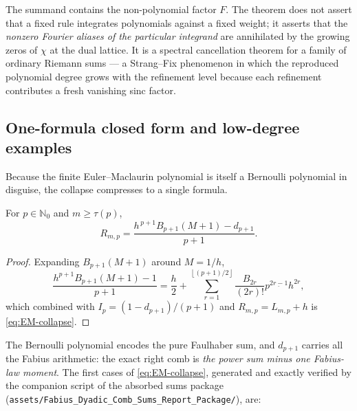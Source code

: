 \documentclass[11pt,oneside]{article}
\numberwithin{equation}{section}
\theoremstyle{definition}
\theoremstyle{remark}
\newcommand{\N}{\mathbb N}
\newcommand{\fall}[2]{#1^{\underline{#2}}}
\newcommand{\floor}[1]{\left\lfloor #1\right\rfloor}
\begin{document}
\begin{remark}
The summand contains the non-polynomial factor $F$.  The theorem does
not assert that a fixed rule integrates polynomials against a fixed
weight; it asserts that the \emph{nonzero Fourier aliases of the
particular integrand} are annihilated by the growing zeros of $\chi$
at the dual lattice.  It is a spectral cancellation theorem for a
family of ordinary Riemann sums --- a Strang--Fix phenomenon
\cite{StrangFix,deBoorRon} in which the reproduced polynomial degree
grows with the refinement level because each refinement contributes a
fresh vanishing sinc factor.
\end{remark}

\subsection{One-formula closed form and low-degree examples}

Because the finite Euler--Maclaurin polynomial is itself a Bernoulli
polynomial in disguise, the collapse compresses to a single formula.

\begin{corollary}
\label{thm:F-stabilization}
For $p\in\N_0$ and $m\ge\tau(p)$,
\begin{equation}
 \boxed{\;
 R_{m,p}
 =\frac{h^{\,p+1}B_{p+1}(M+1)-d_{p+1}}{p+1}.
 \;}
 \label{eq:F-stabilized-Bernoulli}
\end{equation}
\end{corollary}

\begin{proof}
Expanding $B_{p+1}(M+1)$ around $M=1/h$,
\[
 \frac{h^{p+1}B_{p+1}(M+1)-1}{p+1}
 =\frac h2+\sum_{r=1}^{\floor{(p+1)/2}}
 \frac{B_{2r}}{(2r)!}\fall p{2r-1}h^{2r},
\]
which combined with $I_p=(1-d_{p+1})/(p+1)$ and
$R_{m,p}=L_{m,p}+h$ is \eqref{eq:EM-collapse}.
\end{proof}

The Bernoulli polynomial encodes the pure Faulhaber sum, and
$d_{p+1}$ carries all the Fabius arithmetic: the exact right comb is
\emph{the power sum minus one Fabius-law moment}.  The first cases of
\eqref{eq:EM-collapse}, generated and exactly verified by the
companion script of the absorbed sums package
(\nolinkurl{assets/Fabius_Dyadic_Comb_Sums_Report_Package/}), are:
\end{document}
